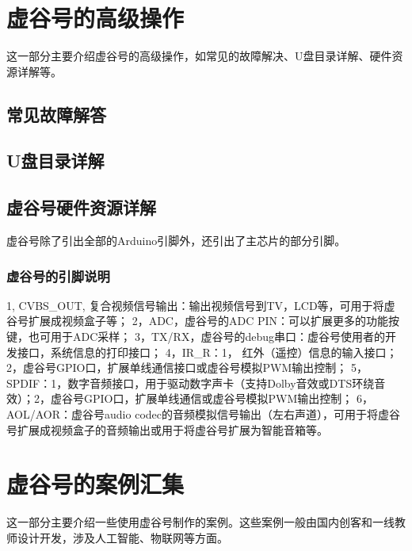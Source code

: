 \documentclass[letterpaper,10pt,english]{sphinxmanual}
\begin{document}
\chapter{虚谷号的高级操作}
\label{\detokenize{08.advanced/index:id1}}\label{\detokenize{08.advanced/index::doc}}
这一部分主要介绍虚谷号的高级操作，如常见的故障解决、U盘目录详解、硬件资源详解等。


\section{常见故障解答}
\label{\detokenize{08.advanced/8.1:id1}}\label{\detokenize{08.advanced/8.1::doc}}

\section{U盘目录详解}
\label{\detokenize{08.advanced/8.2:u}}\label{\detokenize{08.advanced/8.2::doc}}

\section{虚谷号硬件资源详解}
\label{\detokenize{08.advanced/8.3:id1}}\label{\detokenize{08.advanced/8.3::doc}}
虚谷号除了引出全部的Arduino引脚外，还引出了主芯片的部分引脚。


\subsection{虚谷号的引脚说明}
\label{\detokenize{08.advanced/8.3:id2}}
1, CVBS\_OUT, 复合视频信号输出：输出视频信号到TV，LCD等，可用于将虚谷号扩展成视频盒子等；
2，ADC，虚谷号的ADC PIN：可以扩展更多的功能按键，也可用于ADC采样；
3，TX/RX，虚谷号的debug串口：虚谷号使用者的开发接口，系统信息的打印接口；
4，IR\_R：1， 红外（遥控）信息的输入接口；2，虚谷号GPIO口，扩展单线通信接口或虚谷号模拟PWM输出控制；
5，SPDIF：1，数字音频接口，用于驱动数字声卡（支持Dolby音效或DTS环绕音效）；2，虚谷号GPIO口，扩展单线通信或虚谷号模拟PWM输出控制；
6，AOL/AOR：虚谷号audio codec的音频模拟信号输出（左右声道），可用于将虚谷号扩展成视频盒子的音频输出或用于将虚谷号扩展为智能音箱等。

\noindent{}


\chapter{虚谷号的案例汇集}
\label{\detokenize{09.case/index:id1}}\label{\detokenize{09.case/index::doc}}
这一部分主要介绍一些使用虚谷号制作的案例。这些案例一般由国内创客和一线教师设计开发，涉及人工智能、物联网等方面。
\end{document}
